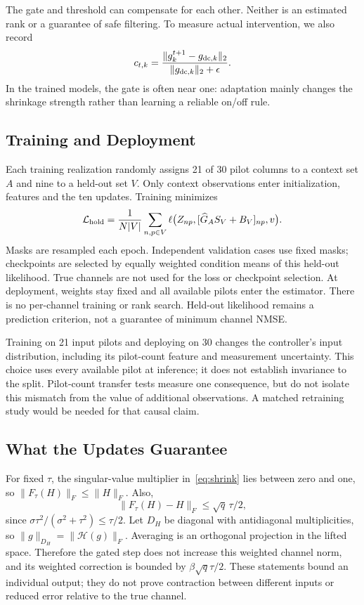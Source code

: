 \documentclass[10pt,journal,letterpaper]{IEEEtran}
\newcommand{\HH}{\mathcal{H}}
\begin{document}
The gate and threshold can compensate for each other. Neither is an estimated rank or a guarantee of safe filtering. To measure actual intervention, we also record
\begin{equation}
 c_{t,k}=\frac{\|g_k^{t+1}-g_{{\rm dc},k}\|_2}{\|g_{{\rm dc},k}\|_2+\epsilon}.
\end{equation}
In the trained models, the gate is often near one: adaptation mainly changes the shrinkage strength rather than learning a reliable on/off rule.

\subsection{Training and Deployment}
Each training realization randomly assigns 21 of 30 pilot columns to a context set $A$ and nine to a held-out set $V$. Only context observations enter initialization, features and the ten updates. Training minimizes
\begin{equation}
 \mathcal L_{\rm hold}=\frac{1}{N|V|}\sum_{n,p\in V}
 \ell\big(Z_{np},[\widehat G_A S_V+B_V]_{np},v\big).
\end{equation}
Masks are resampled each epoch. Independent validation cases use fixed masks; checkpoints are selected by equally weighted condition means of this held-out likelihood. True channels are not used for the loss or checkpoint selection. At deployment, weights stay fixed and all available pilots enter the estimator. There is no per-channel training or rank search. Held-out likelihood remains a prediction criterion, not a guarantee of minimum channel NMSE.

Training on 21 input pilots and deploying on 30 changes the controller's input distribution, including its pilot-count feature and measurement uncertainty. This choice uses every available pilot at inference; it does not establish invariance to the split. Pilot-count transfer tests measure one consequence, but do not isolate this mismatch from the value of additional observations. A matched retraining study would be needed for that causal claim.

\subsection{What the Updates Guarantee}
For fixed $\tau$, the singular-value multiplier in~\eqref{eq:shrink} lies between zero and one, so $\|F_\tau(H)\|_F\le\|H\|_F$. Also,
\begin{equation}
 \|F_\tau(H)-H\|_F\le\sqrt q\,\tau/2,
\end{equation}
since $\sigma\tau^2/(\sigma^2+\tau^2)\le\tau/2$. Let $D_H$ be diagonal with antidiagonal multiplicities, so $\|g\|_{D_H}=\|\HH(g)\|_F$. Averaging is an orthogonal projection in the lifted space. Therefore the gated step does not increase this weighted channel norm, and its weighted correction is bounded by $\beta\sqrt q\tau/2$. These statements bound an individual output; they do not prove contraction between different inputs or reduced error relative to the true channel.
\end{document}
